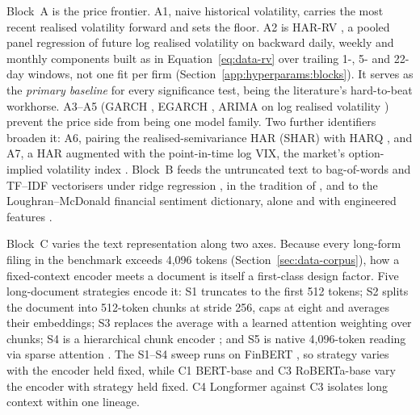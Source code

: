 Block~A is the price frontier. A1, naive historical volatility, carries the most recent realised volatility forward and sets the floor. A2 is HAR-RV \cite{corsi2009har}, a pooled panel regression of future log realised volatility on backward daily, weekly and monthly components built as in Equation~\eqref{eq:data-rv} over trailing 1-, 5- and 22-day windows, not one fit per firm (Section~\ref{app:hyperparams:blocks}). It serves as the \emph{primary baseline} for every significance test, being the literature's hard-to-beat workhorse. A3--A5 (GARCH \cite{bollerslev1986garch,engle1982arch}, EGARCH \cite{nelson1991egarch}, ARIMA on log realised volatility \cite{box1970time}) prevent the price side from being one model family. Two further identifiers broaden it: A6, pairing the realised-semivariance HAR (SHAR) \cite{pattonsheppard2015shar} with HARQ \cite{bollerslev2016harq}, and A7, a HAR augmented with the point-in-time log VIX, the market's option-implied volatility index \cite{blair2001forecasting}. Block~B feeds the untruncated text to bag-of-words and TF--IDF vectorisers under ridge regression \cite{hoerl1970ridge,salton1988term}, in the tradition of \cite{kogan2009predicting}, and to the Loughran--McDonald financial sentiment dictionary, alone and with engineered features \cite{loughran2011liability}. %

Block~C varies the text representation along two axes. Because every long-form filing in the benchmark exceeds 4{,}096 tokens (Section~\ref{sec:data-corpus}), how a fixed-context encoder meets a document is itself a first-class design factor. Five long-document strategies encode it: S1 truncates to the first 512 tokens; S2 splits the document into 512-token chunks at stride 256, caps at eight and averages their embeddings; S3 replaces the average with a learned attention weighting over chunks; S4 is a hierarchical chunk encoder \cite{pappagari2019hierarchical}; and S5 is native 4{,}096-token reading via sparse attention \cite{beltagy2020longformer}. The S1--S4 sweep runs on FinBERT \cite{araci2019finbert}, so strategy varies with the encoder held fixed, while C1 BERT-base \cite{devlin2019bert} and C3 RoBERTa-base \cite{liu2019roberta} vary the encoder with strategy held fixed. C4 Longformer against C3 isolates long context within one lineage. %

